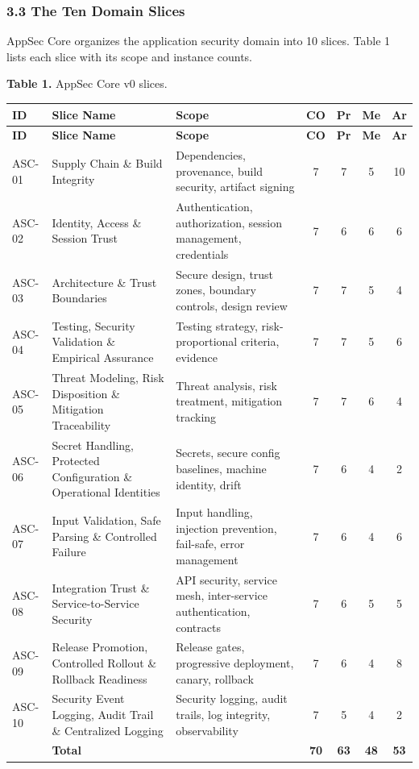 \documentclass[
]{article}
\begin{document}
\subsubsection{3.3 The Ten Domain Slices}\label{the-ten-domain-slices}

AppSec Core organizes the application security domain into 10 slices.
Table 1 lists each slice with its scope and instance counts.

\textbf{Table 1.} AppSec Core v0 slices.

\begin{longtable}{@{}>{\RaggedRight\arraybackslash}p{1.15cm}>{\RaggedRight\arraybackslash}p{4.25cm}>{\RaggedRight\arraybackslash}p{5.45cm}cccc@{}}
\toprule
\textbf{ID} & \textbf{Slice Name} & \textbf{Scope} & \textbf{CO} & \textbf{Pr} & \textbf{Me} & \textbf{Ar} \\
\midrule
\endfirsthead
\toprule
\textbf{ID} & \textbf{Slice Name} & \textbf{Scope} & \textbf{CO} & \textbf{Pr} & \textbf{Me} & \textbf{Ar} \\
\midrule
\endhead
\bottomrule
\endfoot
\bottomrule
\endlastfoot
ASC-01 & Supply Chain \& Build Integrity & Dependencies, provenance, build security, artifact signing & 7 & 7 & 5 & 10 \\
ASC-02 & Identity, Access \& Session Trust & Authentication, authorization, session management, credentials & 7 & 6 & 6 & 6 \\
ASC-03 & Architecture \& Trust Boundaries & Secure design, trust zones, boundary controls, design review & 7 & 7 & 5 & 4 \\
ASC-04 & Testing, Security Validation \& Empirical Assurance & Testing strategy, risk-proportional criteria, evidence & 7 & 7 & 5 & 6 \\
ASC-05 & Threat Modeling, Risk Disposition \& Mitigation Traceability & Threat analysis, risk treatment, mitigation tracking & 7 & 7 & 6 & 4 \\
ASC-06 & Secret Handling, Protected Configuration \& Operational Identities & Secrets, secure config baselines, machine identity, drift & 7 & 6 & 4 & 2 \\
ASC-07 & Input Validation, Safe Parsing \& Controlled Failure & Input handling, injection prevention, fail-safe, error management & 7 & 6 & 4 & 6 \\
ASC-08 & Integration Trust \& Service-to-Service Security & API security, service mesh, inter-service authentication, contracts & 7 & 6 & 5 & 5 \\
ASC-09 & Release Promotion, Controlled Rollout \& Rollback Readiness & Release gates, progressive deployment, canary, rollback & 7 & 6 & 4 & 8 \\
ASC-10 & Security Event Logging, Audit Trail \& Centralized Logging & Security logging, audit trails, log integrity, observability & 7 & 5 & 4 & 2 \\
 & \textbf{Total} &  & \textbf{70} & \textbf{63} & \textbf{48} & \textbf{53} \\
\end{longtable}
\end{document}
